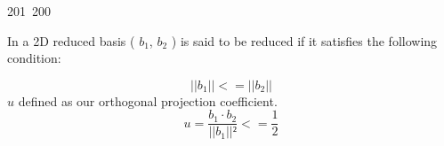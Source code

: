 201~200~\documentclass{article}
\begin{document}
\begin{enumerate}
	                                                                        	                                                                    	                                	                    	                    	                        	                        	                    	                                                            In a 2D reduced basis ( $b_1$, $b_2$ ) is said to be reduced if it satisfies the following condition: 

	                                                                        	                                                                    	                                	                    	                    	                        	                        	                    	                                                                \[
	                                                                        	                                                                    	                                	                    	                    	                        	                        	                    	                                                                	    ||b_1|| <= ||b_2||
	                                                                        	                                                                    	                                	                    	                    	                        	                        	                    	                                                                	        \]
	                                                                        	                                                                    	                                	                    	                    	                        	                        	                    	                                                                	            $u$ defined as our orthogonal projection coefficient.
	                                                                        	                                                                    	                                	                    	                    	                        	                        	                    	                                                                	                \[
	                                                                        	                                                                    	                                	                    	                    	                        	                        	                    	                                                                	                	    u = \frac{b_1 \cdot b_2 }{||b_1||²} <= \frac{1}{2}
	                                                                        	                                                                    	                                	                    	                    	                        	                        	                    	                                                                	                	        \]


\end{enumerate}
\end{document}
